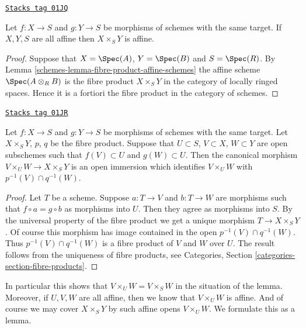 \begin{lemma}
\label{schemes-lemma-fibre-product-affines}
\href{https://stacks.math.columbia.edu/tag/01JQ}{\texttt{Stacks tag 01JQ}}

Let $f : X \to S$ and $g : Y \to S$ be morphisms of schemes
with the same target. If $X, Y, S$ are all affine then
$X \times_S Y$ is affine.
\end{lemma}

\begin{proof}

Suppose that $X = \Spec(A)$, $Y = \Spec(B)$
and $S = \Spec(R)$. By Lemma \ref{schemes-lemma-fibre-product-affine-schemes}
the affine scheme $\Spec(A \otimes_R B)$
is the fibre product $X \times_S Y$ in the category
of locally ringed spaces. Hence it is a fortiori the
fibre product in the category of schemes.
\end{proof}

\begin{lemma}
\label{schemes-lemma-open-fibre-product}
\href{https://stacks.math.columbia.edu/tag/01JR}{\texttt{Stacks tag 01JR}}

Let $f : X \to S$ and $g : Y \to S$ be morphisms of schemes
with the same target. Let $X \times_S Y$, $p$, $q$ be the fibre product.
Suppose that $U \subset S$,
$V \subset X$, $W \subset Y$ are open subschemes
such that $f(V) \subset U$ and $g(W) \subset U$.
Then the canonical morphism
$V \times_U W \to X \times_S Y$ is an open immersion
which identifies $V \times_U W$ with $p^{-1}(V) \cap q^{-1}(W)$.
\end{lemma}

\begin{proof}
Let $T$ be a scheme.
Suppose $a : T \to V$ and $b : T \to W$ are morphisms
such that $f \circ a = g \circ b$ as morphisms into $U$.
Then they agree as morphisms into $S$.
By the universal property of the fibre product we get
a unique morphism $T \to X \times_S Y$. Of course this morphism
has image contained in the open $p^{-1}(V) \cap q^{-1}(W)$.
Thus $p^{-1}(V) \cap q^{-1}(W)$ is a fibre product of
$V$ and $W$ over $U$. The result follows from the uniqueness
of fibre products, see Categories, Section
\ref{categories-section-fibre-products}.
\end{proof}

In particular this shows that $V \times_U W = V \times_S W$
in the situation of the lemma. Moreover, if $U, V, W$ are all
affine, then we know that $V \times_U W$ is affine. And of course
we may cover $X \times_S Y$ by such affine opens $V \times_U W$.
We formulate this as a lemma.

